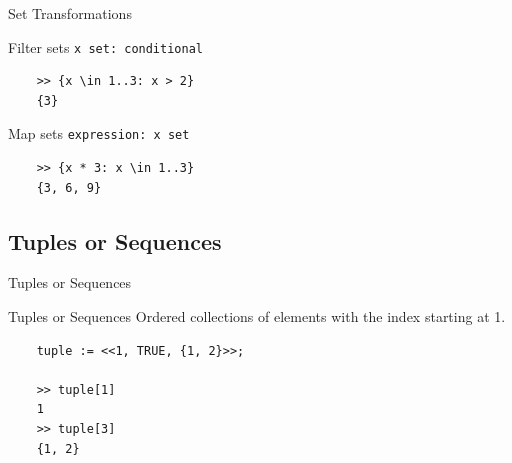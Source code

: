 \documentclass[10pt]{beamer}
\begin{document}
\begin{frame}[fragile]{Set Transformations}
  \begin{exampleblock}{Filter sets}
    \texttt{{x \in set: conditional}}
  \end{exampleblock}

  \begin{verbatim}
    >> {x \in 1..3: x > 2}
    {3}
  \end{verbatim}

  \begin{exampleblock}{Map sets}
    \texttt{{expression: x \in set}}
  \end{exampleblock}

  \begin{verbatim}
    >> {x * 3: x \in 1..3}
    {3, 6, 9}
  \end{verbatim}
  
\end{frame}

\subsection{Tuples or Sequences}

\begin{frame}[fragile]{Tuples or Sequences}

  \begin{exampleblock}{Tuples or Sequences}
    \alert{Ordered} collections of elements with the \alert{index starting at 1}.
  \end{exampleblock}

  \begin{verbatim}
    tuple := <<1, TRUE, {1, 2}>>;
    
    >> tuple[1]
    1
    >> tuple[3]
    {1, 2}
  \end{verbatim}
\end{frame}
\end{document}
